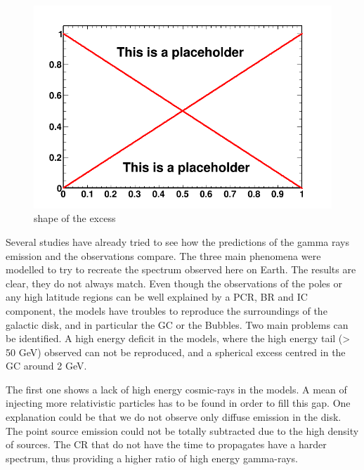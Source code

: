 \begin{figure}
 \centering
 \includegraphics[width=.9\linewidth]{pic/dummy.png}
 \caption{shape of the excess}
 \label{fig:first_BKGonly_fits}
\end{figure}

Several studies have already tried to see how the predictions of the gamma rays emission and the observations compare. The three main phenomena were modelled to try to recreate the spectrum observed here on Earth. The results are clear, they do not always match.
Even though the observations of the poles or any high latitude regions can be well explained by a PCR, BR and IC component, the models have troubles to reproduce the surroundings of the galactic disk, and in particular the GC or the Bubbles. 
Two main problems can be identified. A high energy deficit in the models, where the high energy tail (> 50 GeV) observed can not be reproduced, and a spherical excess centred in the GC around 2 GeV.

The first one shows a lack of high energy cosmic-rays in the models. A mean of injecting more relativistic particles has to be found in order to fill this gap. One explanation could be that we do not observe only diffuse emission in the disk. The point source emission could not be totally subtracted due to the high density of sources. The CR that do not have the time to propagates have a harder spectrum, thus providing a higher ratio of high energy gamma-rays.

